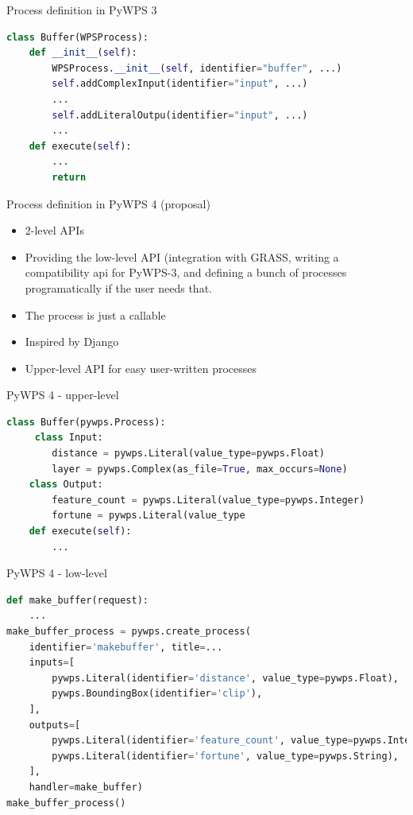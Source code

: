 \documentclass[xcolor=dvipsnames]{beamer}
\begin{document}
\begin{frame}[fragile]{Process definition in PyWPS 3}
    \begin{lstlisting}[language=Python]
class Buffer(WPSProcess):
    def __init__(self):
        WPSProcess.__init__(self, identifier="buffer", ...)
        self.addComplexInput(identifier="input", ...)
        ...
        self.addLiteralOutpu(identifier="input", ...)
        ...
    def execute(self):
        ...
        return
    \end{lstlisting}
\end{frame}

\begin{frame}[fragile]{Process definition in PyWPS 4 (proposal)}
    \begin{itemize}
        \item 2-level APIs
        \item Providing the low-level API (integration with GRASS, writing a compatibility api for PyWPS-3, and defining a bunch of processes programatically if the user needs that. 
        \item The process is just a callable
        \item Inspired by Django
        \item Upper-level API for easy user-written processes
    \end{itemize}
\end{frame}

\begin{frame}[fragile]{PyWPS 4 - upper-level}
\begin{lstlisting}[language=Python]
class Buffer(pywps.Process):
     class Input:
        distance = pywps.Literal(value_type=pywps.Float)
        layer = pywps.Complex(as_file=True, max_occurs=None)
    class Output:
        feature_count = pywps.Literal(value_type=pywps.Integer)
        fortune = pywps.Literal(value_type
    def execute(self):
        ...
\end{lstlisting}
\end{frame}

\begin{frame}[fragile]{PyWPS 4 - low-level}
\begin{lstlisting}[language=Python]
def make_buffer(request):
    ...
make_buffer_process = pywps.create_process(
    identifier='makebuffer', title=...
    inputs=[
        pywps.Literal(identifier='distance', value_type=pywps.Float),
        pywps.BoundingBox(identifier='clip'),
    ],
    outputs=[
        pywps.Literal(identifier='feature_count', value_type=pywps.Integer),
        pywps.Literal(identifier='fortune', value_type=pywps.String),
    ],
    handler=make_buffer)
make_buffer_process()
\end{lstlisting}
\end{frame}
\end{document}
